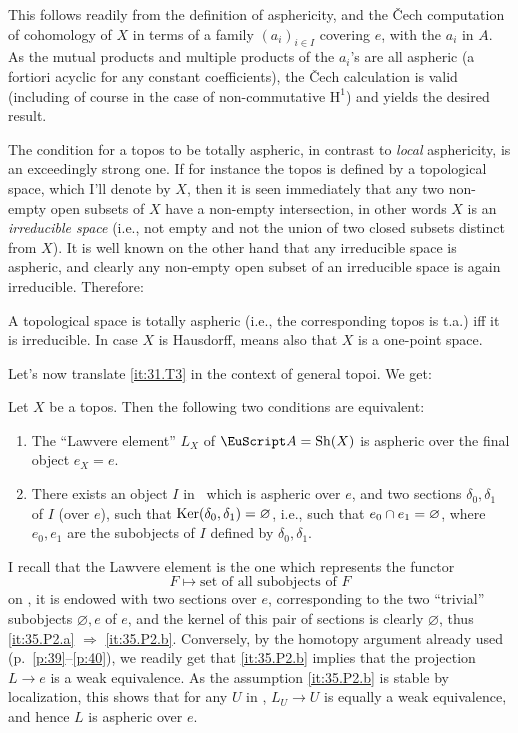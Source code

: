 This follows readily from the definition of asphericity, and the
\v{C}ech computation of cohomology of $X$ in terms of a family
$(a_i)_{i\in I}$ covering $e$, with the $a_i$ in $A$. As the mutual
products and multiple products of the $a_i$'s are all aspheric (a
fortiori acyclic for any constant coefficients), the \v Cech
calculation is valid (including of course in the case of
non-commutative $\mathrm H^1$) and yields the desired result.

The condition for a topos to be totally aspheric, in contrast to
\emph{local} asphericity, is an exceedingly strong one. If for
instance the topos is defined by a topological space, which I'll
denote by $X$, then it is seen immediately that any two non-empty open
subsets of $X$ have a non-empty intersection, in other words $X$ is an
\emph{irreducible space} (i.e., not empty and not the union of two
closed subsets distinct from $X$). It is well known on the other hand
that any irreducible space is aspheric, and clearly any non-empty open
subset of an irreducible space is again irreducible. Therefore:
\setcounter{corollarynum}{1}
\begin{corollarynum}\label{cor:35.1.2}
  A topological space is totally aspheric \textup{(}i.e., the
  corresponding topos is t.a.\textup{)} if{f} it is irreducible. In
  case $X$ is Hausdorff, means also that $X$ is a one-point space.
\end{corollarynum}

Let's now translate \ref{it:31.T3} in the context of general topoi. We
get:

\begin{propositionnum}\label{prop:35.2}
  Let $X$ be a topos. Then the following two conditions are
  equivalent:
  \begin{enumerate}[label=\alph*),font=\normalfont]
  \item\label{it:35.P2.a}
    The ``Lawvere element'' $L_X$ of $\scrA = \Sh(X)$ is aspheric
    over the final object $e_X=e$.
  \item\label{it:35.P2.b}
    There exists an object $I$ in \scrA\ which is aspheric over
    $e$, and two sections $\delta_0,\delta_1$ of $I$ \textup(over
    $e$\textup), such that $\operatorname{Ker}(\delta_0,\delta_1)=\varnothing$, i.e.,
    such that $e_0 \mathbin{\cap} e_1 = \varnothing$, where $e_0,e_1$ are the
    subobjects of $I$ defined by $\delta_0,\delta_1$.
  \end{enumerate}
\end{propositionnum}

I recall that the Lawvere element is the one which represents the
functor
\[ F \mapsto \text{set of all subobjects of $F$}\]
on \scrA, it is endowed with two sections over $e$, corresponding to
the two ``trivial'' subobjects $\varnothing, e$ of $e$, and the kernel
of this pair of sections is clearly $\varnothing$, thus \ref{it:35.P2.a}
$\Rightarrow$ \ref{it:35.P2.b}. Conversely, by the homotopy argument
already used (p.\ \ref{p:39}--\ref{p:40}),
we readily get that \ref{it:35.P2.b}
implies that the projection $L\to e$ is a weak
equivalence. As the assumption \ref{it:35.P2.b} is stable by
localization, this shows that for any $U$ in \scrA, $L_U \to U$ is
equally a weak equivalence, and hence $L$ is aspheric over $e$.

